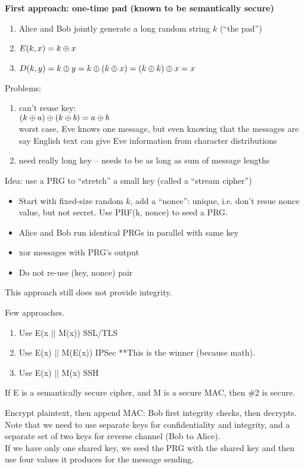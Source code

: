 {\bf First approach: one-time pad (known to be semantically secure)}
\begin{enumerate}
    \item Alice and Bob jointly generate a long random string $k$ (``the pad'')
    \item $E(k, x) = k \oplus x$
    \item $D(k, y) = k \oplus y = k \oplus (k \oplus x) = (k \oplus k) \oplus x = x$
\end{enumerate}
Problems:
\begin{enumerate}
    \item can't reuse key:\\
        $(k \oplus a) \oplus (k \oplus b) = a \oplus b$\\
        worst case, Eve knows one message, but even knowing that the messages
        are say English text can give Eve information from character
        distributions
    \item need really long key -- needs to be as long as sum of message lengths
\end{enumerate}
Idea: use a PRG to ``stretch'' a small key (called a ``stream cipher'')
\begin{itemize}
    \item Start with fixed-size random $k$, add a ``nonce'': unique, i.e. don't resue nonce value,
      but not secret.  Use PRF(k, nonce) to seed a PRG.
    \item Alice and Bob run identical PRGs in parallel with same key
    \item xor messages with PRG's output
    \item Do not re-use (key, nonce) pair
\end{itemize}
  This approach still does not provide integrity.

Few approaches.
\begin{enumerate}
  \item Use E(x $||$ M(x)) \hspace{1cm}SSL/TLS
  \item Use E(x) $||$ M(E(x)) \hspace{1cm}IPSec  **This is the winner (because math).
  \item Use E(x) $||$ M(x) \hspace{1cm}SSH\\
\end{enumerate}

\begin{theorem}
If E is a semantically secure cipher, and M is a secure MAC, then \#2 is secure.
\end{theorem}

Encrypt plaintext, then append MAC: Bob first integrity checks, then decrypts.
Note that we need to use separate keys for confidentiality and integrity, and a
separate set of two keys for reverse channel (Bob to Alice).\\

If we have only one shared key, we seed the PRG with the shared key and then use
four  values it produces for the message sending.
